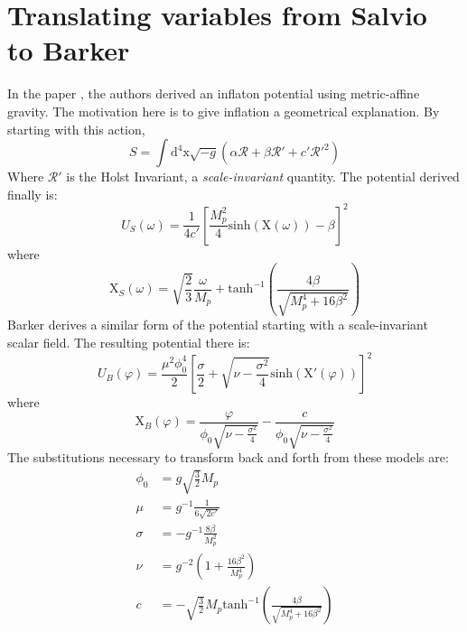\documentclass[aps,prd,reprint,preprintnumbers,showpacs,floatfix,nofootinbib,superscript address]{revtex4-2}
\begin{document}
\section{Translating variables from Salvio to Barker} \label{Appendix A}
In the paper \cite{Salvio_2022}, the authors derived an inflaton potential using metric-affine gravity. The motivation here is to give inflation a geometrical explanation. 
By starting with this action, 
\begin{equation}
    S = \int \text{d}^4\text{x} \sqrt{-g} (\alpha \mathcal{R} + \beta \mathcal{R}' + c' \mathcal{R}'^{2})
\end{equation}
Where $\mathcal{R}'$ is the Holst Invariant, a \textit{scale-invariant} quantity. The potential derived finally is: 
\begin{equation}
    U_S(\omega) = \frac{1}{4 c'} \left[ \frac{M_{p}^{2}}{4} \text{sinh}(\text{X}(\omega)) - \beta  \right]^2
\end{equation}
where
\begin{equation}
    \text{X}_S(\omega) = \sqrt{\frac{2}{3}} \frac{\omega}{M_{p}} + \text{tanh}^{-1} \left(\frac{4 \beta}{\sqrt{M_{p}^{4}+16 \beta^2}} \right)
\end{equation}
Barker \cite{barker2024poincaregaugetheoryconformal} derives a similar form of the potential starting with a scale-invariant scalar field. The resulting potential there is:
\begin{equation}
    U_B(\varphi) = \frac{\mu^2 \phi_{0}^{4}}{2} \left[ \frac{\sigma}{2} + \sqrt{\nu - \frac{\sigma^2}{4}} \text{sinh}\left( \text{X}'(\varphi) \right)  \right]^2
\end{equation}
where
\begin{equation}
    \text{X}_B(\varphi) =  \frac{\varphi}{\phi_0 \sqrt{\nu - \frac{\sigma^2}{4}}} - \frac{c}{\phi_0 \sqrt{\nu - \frac{\sigma^2}{4}}}
\end{equation}
The substitutions necessary to transform back and forth from these models are: 
\begin{align}
    \phi_0 &= g \sqrt{\frac{3}{2}} M_p  \nonumber \\
    \mu &= g^{-1} \frac{1}{6 \sqrt{2 c'}}  \nonumber \\
    \sigma &= - g^{-1} \frac{8 \beta}{M_{p}^{2}}  \nonumber \\
    \nu &= g^{-2} \left( 1 + \frac{16 \beta^2}{M_{p}^{4}} \right) \nonumber \\
    c  &= -\sqrt{\frac{3}{2}} M_{p} \text{tanh}^{-1} \left(\frac{4 \beta}{\sqrt{M_{p}^{4}+16 \beta^2}} \right)
\end{align}
\end{document}
